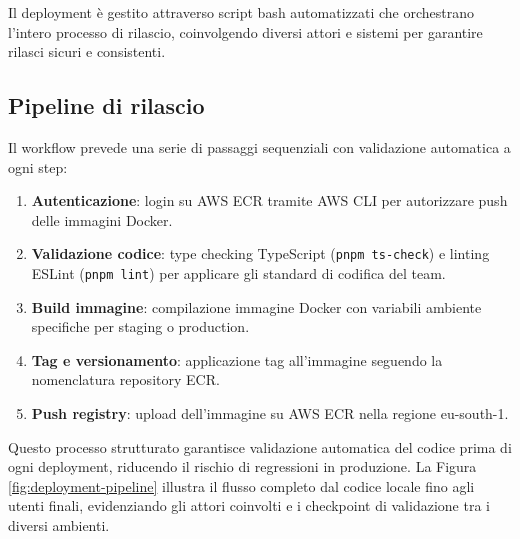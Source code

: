 Il deployment è gestito attraverso script bash automatizzati che orchestrano 
l'intero processo di rilascio, coinvolgendo diversi attori e sistemi per 
garantire rilasci sicuri e consistenti.

\subsection{Pipeline di rilascio}

Il workflow prevede una serie di passaggi sequenziali con validazione automatica 
a ogni step:

\begin{enumerate}
  \item \textbf{Autenticazione}: login su AWS ECR tramite AWS CLI per autorizzare 
        push delle immagini Docker.
  \item \textbf{Validazione codice}: type checking TypeScript (\texttt{pnpm ts-check}) 
        e linting ESLint (\texttt{pnpm lint}) per applicare gli standard di codifica del team.
  \item \textbf{Build immagine}: compilazione immagine Docker con variabili 
        ambiente specifiche per staging o production.
  \item \textbf{Tag e versionamento}: applicazione tag all'immagine seguendo 
        la nomenclatura repository ECR.
  \item \textbf{Push registry}: upload dell'immagine su AWS ECR nella regione eu-south-1.
\end{enumerate}

\medskip
Questo processo strutturato garantisce validazione automatica del codice prima 
di ogni deployment, riducendo il rischio di regressioni in produzione. La Figura 
\ref{fig:deployment-pipeline} illustra il flusso completo dal codice locale fino 
agli utenti finali, evidenziando gli attori coinvolti e i checkpoint di validazione 
tra i diversi ambienti.

